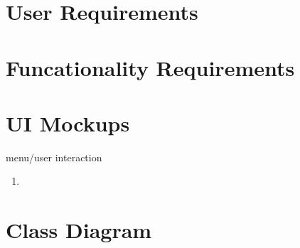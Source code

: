 \documentclass[11pt]{article}
\begin{document}
\section{User Requirements}

\section{Funcationality Requirements}

\section{UI Mockups}
menu/user interaction
\begin{enumerate}[leftmargin=4\parindent]
 \item 
\end{enumerate}

\section{Class Diagram}


\end{document}
